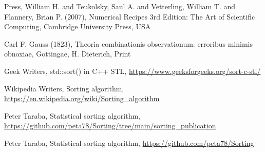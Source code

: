 \documentclass[12pt]{article}
\begin{document}
\begin{thebibliography}{9}
Press, William H. and Teukolsky, Saul A. and Vetterling, William T. and Flannery, Brian P. (2007), Numerical Recipes 3rd Edition: The Art of Scientific Computing, Cambridge University Press, USA

Carl F. Gauss (1823), Theoria combinationis observationum: erroribus minimis obnoxiae, Gottingae, H. Dieterich, Print

Geek Writers, std::sort() in C++ STL, \url{https://www.geeksforgeeks.org/sort-c-stl/}

Wikipedia Writers, Sorting algorithm, \url{https://en.wikipedia.org/wiki/Sorting_algorithm}

Peter Taraba, Statistical sorting algorithm, \url{https://github.com/peta78/Sorting/tree/main/sorting_publication}

Peter Taraba, Statistical sorting algorithm, \url{https://github.com/peta78/Sorting}

\end{thebibliography}

	
	
\end{document}

